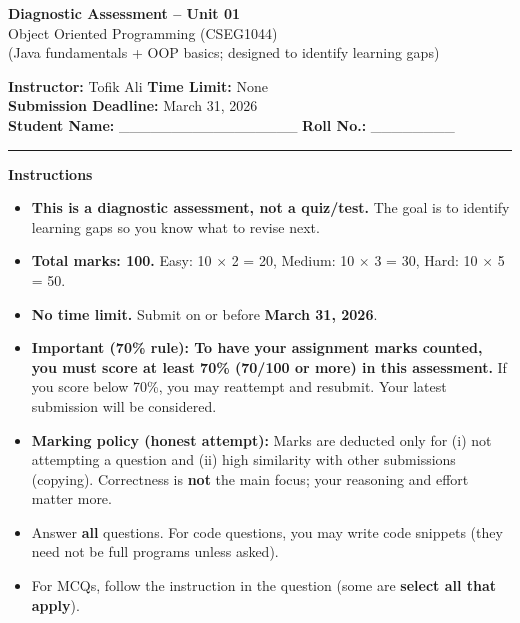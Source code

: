 \documentclass[11pt,a4paper]{article}
\begin{document}
\begin{center}
  {\LARGE \textbf{Diagnostic Assessment -- Unit 01}}\\[0.25em]
  {\large Object Oriented Programming (CSEG1044)}\\[0.25em]
  \normalsize (Java fundamentals + OOP basics; designed to identify learning gaps)
\end{center}

\noindent
\textbf{Instructor:} Tofik Ali \hfill \textbf{Time Limit:} None\\
\textbf{Submission Deadline:} March 31, 2026\\
\textbf{Student Name:} \_\_\_\_\_\_\_\_\_\_\_\_\_\_\_\_\_ \hfill \textbf{Roll No.:} \_\_\_\_\_\_\_\_\\

\vspace{0.6em}
\hrule
\vspace{0.8em}

\textbf{Instructions}
\begin{itemize}[leftmargin=*]
  \item \textbf{This is a diagnostic assessment, not a quiz/test.} The goal is to identify learning gaps so you know what to revise next.
  \item \textbf{Total marks: 100.} Easy: 10 $\times$ 2 = 20, Medium: 10 $\times$ 3 = 30, Hard: 10 $\times$ 5 = 50.
  \item \textbf{No time limit.} Submit on or before \textbf{March 31, 2026}.
  \item \textbf{Important (70\% rule): To have your assignment marks counted, you must score at least 70\% (70/100 or more) in this assessment.}
    If you score below 70\%, you may reattempt and resubmit. Your latest submission will be considered.
  \item \textbf{Marking policy (honest attempt):} Marks are deducted only for (i) not attempting a question and (ii) high similarity with other submissions (copying).
    Correctness is \textbf{not} the main focus; your reasoning and effort matter more.
  \item Answer \textbf{all} questions. For code questions, you may write code snippets (they need not be full programs unless asked).
  \item For MCQs, follow the instruction in the question (some are \textbf{select all that apply}).
\end{itemize}

\vspace{0.6em}
\end{document}
